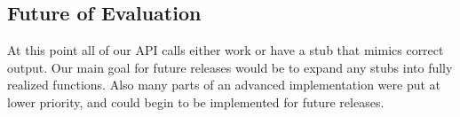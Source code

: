 \smallskip\subsection*{Future of Evaluation}
At this point all of our API calls either work or have a stub that mimics correct output. Our main goal for future releases would be to expand any stubs into fully realized functions. Also many parts of an advanced implementation were put at lower priority, and could begin to be implemented for future releases. 